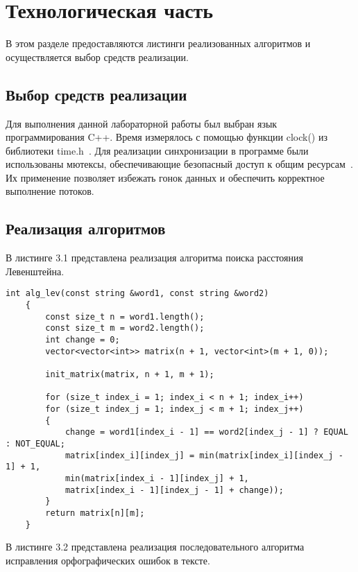 \chapter{Технологическая часть}

В этом разделе предоставляются листинги реализованных алгоритмов и
осуществляется выбор средств реализации.

\section{Выбор средств реализации}

Для выполнения данной лабораторной работы был выбран язык программирования C++. 
Время измерялось с помощью функции clock() из библиотеки time.h~\cite{clock_t}.
Для реализации синхронизации в программе были использованы мютексы, обеспечивающие безопасный доступ к общим ресурсам~\cite{mutex}.
Их применение позволяет избежать гонок данных и обеспечить корректное выполнение потоков.


\section{Реализация алгоритмов}

В листинге 3.1 представлена реализация алгоритма поиска расстояния Левенштейна.

\clearpage

\begin{lstlisting}[caption=Алгоритм поиска расстояния Левенштейна]
	int alg_lev(const string &word1, const string &word2)
	{
		const size_t n = word1.length();
		const size_t m = word2.length();
		int change = 0; 
		vector<vector<int>> matrix(n + 1, vector<int>(m + 1, 0));
		
		init_matrix(matrix, n + 1, m + 1);
		
		for (size_t index_i = 1; index_i < n + 1; index_i++)
		for (size_t index_j = 1; index_j < m + 1; index_j++)
		{
			change = word1[index_i - 1] == word2[index_j - 1] ? EQUAL : NOT_EQUAL;
			matrix[index_i][index_j] = min(matrix[index_i][index_j - 1] + 1,
			min(matrix[index_i - 1][index_j] + 1,
			matrix[index_i - 1][index_j - 1] + change));
		}
		return matrix[n][m];
	}
\end{lstlisting}

\clearpage

В листинге 3.2 представлена реализация последовательного алгоритма исправления орфографических ошибок в тексте.

